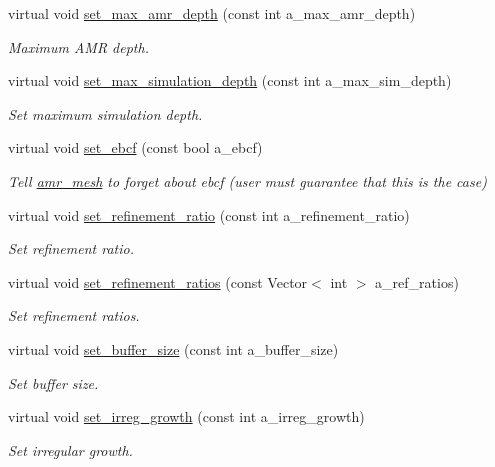\begin{DoxyCompactItemize}
virtual void \hyperlink{classamr__mesh_a9726e445f907e1c59b081289c3fa7af6}{set\+\_\+max\+\_\+amr\+\_\+depth} (const int a\+\_\+max\+\_\+amr\+\_\+depth)
\begin{DoxyCompactList}\small\item\em Maximum A\+MR depth. \end{DoxyCompactList}\item 
virtual void \hyperlink{classamr__mesh_a9b520f9c6335eec806ee7db7c159da80}{set\+\_\+max\+\_\+simulation\+\_\+depth} (const int a\+\_\+max\+\_\+sim\+\_\+depth)
\begin{DoxyCompactList}\small\item\em Set maximum simulation depth. \end{DoxyCompactList}\item 
virtual void \hyperlink{classamr__mesh_af786536055cfdcf77daf781f570cd06d}{set\+\_\+ebcf} (const bool a\+\_\+ebcf)
\begin{DoxyCompactList}\small\item\em Tell \hyperlink{classamr__mesh}{amr\+\_\+mesh} to forget about ebcf (user must guarantee that this is the case) \end{DoxyCompactList}\item 
virtual void \hyperlink{classamr__mesh_a936cf1336bc2ab8f48255aa9c8dfd3c7}{set\+\_\+refinement\+\_\+ratio} (const int a\+\_\+refinement\+\_\+ratio)
\begin{DoxyCompactList}\small\item\em Set refinement ratio. \end{DoxyCompactList}\item 
virtual void \hyperlink{classamr__mesh_ad6eecfd33886e0894f1cb6e4f4f38042}{set\+\_\+refinement\+\_\+ratios} (const Vector$<$ int $>$ a\+\_\+ref\+\_\+ratios)
\begin{DoxyCompactList}\small\item\em Set refinement ratios. \end{DoxyCompactList}\item 
virtual void \hyperlink{classamr__mesh_a3ffa8ff8da3c3d7f4f86ca3608603d30}{set\+\_\+buffer\+\_\+size} (const int a\+\_\+buffer\+\_\+size)
\begin{DoxyCompactList}\small\item\em Set buffer size. \end{DoxyCompactList}\item 
virtual void \hyperlink{classamr__mesh_aac57f4842719b91446ff4990c495ebda}{set\+\_\+irreg\+\_\+growth} (const int a\+\_\+irreg\+\_\+growth)
\begin{DoxyCompactList}\small\item\em Set irregular growth. \end{DoxyCompactList}\item 

\end{DoxyCompactItemize}
